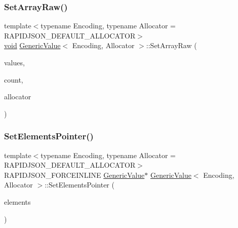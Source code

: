 \subsubsection{\texorpdfstring{Set\+Array\+Raw()}{SetArrayRaw()}}
{\footnotesize\ttfamily template$<$typename Encoding, typename Allocator = R\+A\+P\+I\+D\+J\+S\+O\+N\+\_\+\+D\+E\+F\+A\+U\+L\+T\+\_\+\+A\+L\+L\+O\+C\+A\+T\+OR$>$ \\
\hyperlink{imgui__impl__opengl3__loader_8h_ac668e7cffd9e2e9cfee428b9b2f34fa7}{void} \hyperlink{classGenericValue}{Generic\+Value}$<$ Encoding, Allocator $>$\+::Set\+Array\+Raw (\begin{DoxyParamCaption}\item[{\hyperlink{classGenericValue}{Generic\+Value}$<$ Encoding, Allocator $>$ $\ast$}]{values,  }\item[{\hyperlink{rapidjson_8h_a5ed6e6e67250fadbd041127e6386dcb5}{Size\+Type}}]{count,  }\item[{Allocator \&}]{allocator }\end{DoxyParamCaption})\hspace{0.3cm}{\ttfamily [inline]}}

\mbox{\label{classGenericValue_ad8ac8518160251babea5065f9eea8982}} 
\subsubsection{\texorpdfstring{Set\+Elements\+Pointer()}{SetElementsPointer()}}
{\footnotesize\ttfamily template$<$typename Encoding, typename Allocator = R\+A\+P\+I\+D\+J\+S\+O\+N\+\_\+\+D\+E\+F\+A\+U\+L\+T\+\_\+\+A\+L\+L\+O\+C\+A\+T\+OR$>$ \\
R\+A\+P\+I\+D\+J\+S\+O\+N\+\_\+\+F\+O\+R\+C\+E\+I\+N\+L\+I\+NE \hyperlink{classGenericValue}{Generic\+Value}$\ast$ \hyperlink{classGenericValue}{Generic\+Value}$<$ Encoding, Allocator $>$\+::Set\+Elements\+Pointer (\begin{DoxyParamCaption}\item[{\hyperlink{classGenericValue}{Generic\+Value}$<$ Encoding, Allocator $>$ $\ast$}]{elements }\end{DoxyParamCaption})\hspace{0.3cm}{\ttfamily [inline]}}

\mbox{\label{classGenericValue_a0b488cb0120b154eadde27dc0e694019}} 
